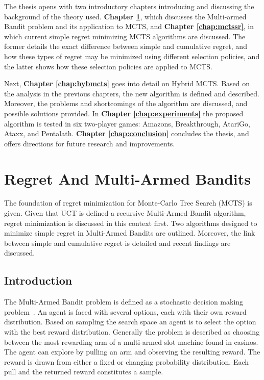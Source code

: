 \documentclass{kecsmstr}
\begin{document}
The thesis opens with two introductory chapters introducing and discussing the background of the theory used. \textbf{Chapter \ref{chap:mab}}, which discusses the Multi-armed Bandit problem and its application to MCTS, and \textbf{Chapter \ref{chap:mctssr}}, in which current simple regret minimizing MCTS algorithms are discussed. The former details the exact difference between simple and cumulative regret, and how these types of regret may be minimized using different selection policies, and the latter shows how these selection policies are applied to MCTS.

Next, \textbf{Chapter \ref{chap:hybmcts}} goes into detail on Hybrid MCTS. Based on the analysis in the previous chapters, the new algorithm is defined and described. Moreover, the problems and shortcomings of the algorithm are discussed, and possible solutions provided. In \textbf{Chapter \ref{chap:experiments}} the proposed algorithm is tested in six two-player games: Amazons, Breakthrough, AtariGo, Ataxx, and Pentalath. \textbf{Chapter \ref{chap:conclusion}} concludes the thesis, and offers directions for future research and improvements.

\chapter{Regret And Multi-Armed Bandits}
\label{chap:mab}
\begin{chaptercontents} The foundation of regret minimization for Monte-Carlo Tree Search (MCTS) is given. Given that UCT is defined a recursive Multi-Armed Bandit algorithm, regret minimization is discussed in this context first. Two algorithms designed to minimize simple regret in Multi-Armed Bandits are outlined. Moreover, the link between simple and cumulative regret is detailed and recent findings are discussed. 
\end{chaptercontents}

\section{Introduction}
The Multi-Armed Bandit problem is defined as a stochastic decision making problem~. An agent is faced with several options, each with their own reward distribution. Based on sampling the search space an agent is to select the option with the best reward distribution. Generally the problem is described as choosing between the most rewarding arm of a multi-armed slot machine found in casinos. The agent can explore by pulling an arm and observing the resulting reward. The reward is drawn from either a fixed or changing probability distribution. Each pull and the returned reward constitutes a sample.
\end{document}
